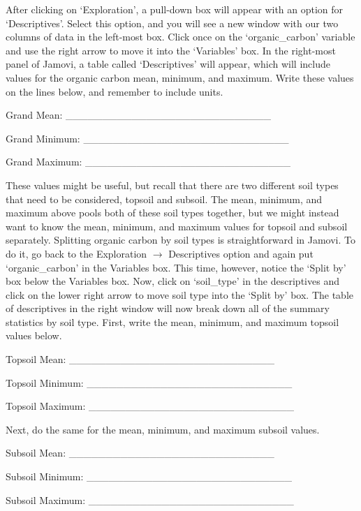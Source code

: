 \documentclass[
]{scrbook}
\begin{document}
After clicking on `Exploration', a pull-down box will appear with an option for `Descriptives'.
Select this option, and you will see a new window with our two columns of data in the left-most box.
Click once on the `organic\_carbon' variable and use the right arrow to move it into the `Variables' box.
In the right-most panel of Jamovi, a table called `Descriptives' will appear, which will include values for the organic carbon mean, minimum, and maximum.
Write these values on the lines below, and remember to include units.

Grand Mean: \_\_\_\_\_\_\_\_\_\_\_\_\_\_\_\_\_\_\_\_\_\_\_\_\_\_\_\_

Grand Minimum: \_\_\_\_\_\_\_\_\_\_\_\_\_\_\_\_\_\_\_\_\_\_\_\_\_\_\_\_

Grand Maximum: \_\_\_\_\_\_\_\_\_\_\_\_\_\_\_\_\_\_\_\_\_\_\_\_\_\_\_\_

These values might be useful, but recall that there are two different soil types that need to be considered, topsoil and subsoil.
The mean, minimum, and maximum above pools both of these soil types together, but we might instead want to know the mean, minimum, and maximum values for topsoil and subsoil separately.
Splitting organic carbon by soil types is straightforward in Jamovi.
To do it, go back to the Exploration \(\to\) Descriptives option and again put `organic\_carbon' in the Variables box.
This time, however, notice the `Split by' box below the Variables box.
Now, click on `soil\_type' in the descriptives and click on the lower right arrow to move soil type into the `Split by' box.
The table of descriptives in the right window will now break down all of the summary statistics by soil type.
First, write the mean, minimum, and maximum topsoil values below.

Topsoil Mean: \_\_\_\_\_\_\_\_\_\_\_\_\_\_\_\_\_\_\_\_\_\_\_\_\_\_\_\_

Topsoil Minimum: \_\_\_\_\_\_\_\_\_\_\_\_\_\_\_\_\_\_\_\_\_\_\_\_\_\_\_\_

Topsoil Maximum: \_\_\_\_\_\_\_\_\_\_\_\_\_\_\_\_\_\_\_\_\_\_\_\_\_\_\_\_

Next, do the same for the mean, minimum, and maximum subsoil values.

Subsoil Mean: \_\_\_\_\_\_\_\_\_\_\_\_\_\_\_\_\_\_\_\_\_\_\_\_\_\_\_\_

Subsoil Minimum: \_\_\_\_\_\_\_\_\_\_\_\_\_\_\_\_\_\_\_\_\_\_\_\_\_\_\_\_

Subsoil Maximum: \_\_\_\_\_\_\_\_\_\_\_\_\_\_\_\_\_\_\_\_\_\_\_\_\_\_\_\_
\end{document}
